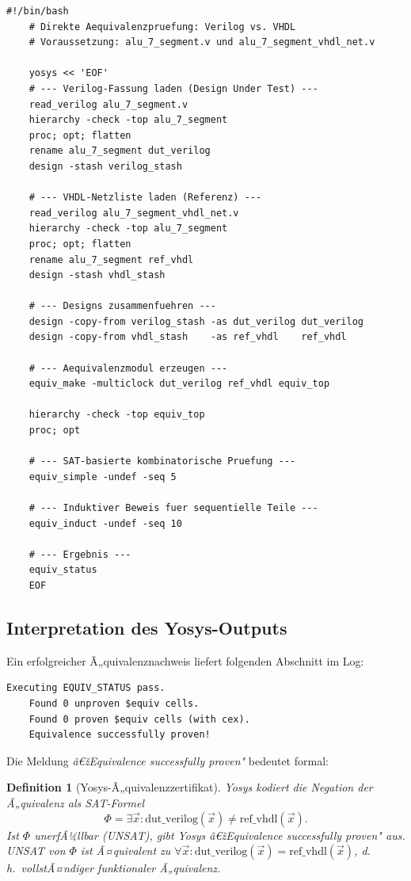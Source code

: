 ﻿\documentclass[12pt,a4paper]{report}
\newtheorem{definition}{Definition}[section]
\begin{document}
\begin{lstlisting}[style=bashstyle, caption={Yosys-Ã„quivalenzprÃ¼fung: Verilog vs.\ VHDL-Netzliste}]
	#!/bin/bash
	# Direkte Aequivalenzpruefung: Verilog vs. VHDL
	# Voraussetzung: alu_7_segment.v und alu_7_segment_vhdl_net.v
	
	yosys << 'EOF'
	# --- Verilog-Fassung laden (Design Under Test) ---
	read_verilog alu_7_segment.v
	hierarchy -check -top alu_7_segment
	proc; opt; flatten
	rename alu_7_segment dut_verilog
	design -stash verilog_stash
	
	# --- VHDL-Netzliste laden (Referenz) ---
	read_verilog alu_7_segment_vhdl_net.v
	hierarchy -check -top alu_7_segment
	proc; opt; flatten
	rename alu_7_segment ref_vhdl
	design -stash vhdl_stash
	
	# --- Designs zusammenfuehren ---
	design -copy-from verilog_stash -as dut_verilog dut_verilog
	design -copy-from vhdl_stash    -as ref_vhdl    ref_vhdl
	
	# --- Aequivalenzmodul erzeugen ---
	equiv_make -multiclock dut_verilog ref_vhdl equiv_top
	
	hierarchy -check -top equiv_top
	proc; opt
	
	# --- SAT-basierte kombinatorische Pruefung ---
	equiv_simple -undef -seq 5
	
	# --- Induktiver Beweis fuer sequentielle Teile ---
	equiv_induct -undef -seq 10
	
	# --- Ergebnis ---
	equiv_status
	EOF
\end{lstlisting}

\subsection{Interpretation des Yosys-Outputs}

Ein erfolgreicher Ã„quivalenznachweis liefert folgenden Abschnitt im Log:

\begin{lstlisting}[style=bashstyle]
	Executing EQUIV_STATUS pass.
	Found 0 unproven $equiv cells.
	Found 0 proven $equiv cells (with cex).
	Equivalence successfully proven!
\end{lstlisting}

Die Meldung \textit{â€žEquivalence successfully proven"} bedeutet formal:

\begin{definition}[Yosys-Ã„quivalenzzertifikat]
	Yosys kodiert die Negation der Ã„quivalenz als SAT-Formel
	\[
	\Phi = \exists \vec{x} : \mathrm{dut\_verilog}(\vec{x}) \neq \mathrm{ref\_vhdl}(\vec{x}).
	\]
	Ist $\Phi$ unerfÃ¼llbar (UNSAT), gibt Yosys \textit{â€žEquivalence successfully
		proven"} aus.  UNSAT von $\Phi$ ist Ã¤quivalent zu
	$\forall \vec{x} : \mathrm{dut\_verilog}(\vec{x}) = \mathrm{ref\_vhdl}(\vec{x})$,
	d.\,h.\ vollstÃ¤ndiger funktionaler Ã„quivalenz.
\end{definition}
\end{document}
